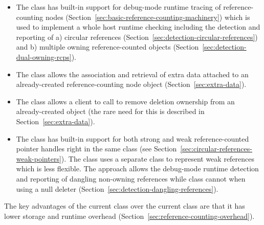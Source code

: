 \documentclass[pdf,ps2pdf,11pt]{SANDreport}
\begin{document}
\begin{itemize}

{}\item The {} class has built-in support for debug-mode
runtime tracing of reference-counting nodes
(Section~\ref{sec:basic-reference-counting-machinery}) which is used
to implement a whole host runtime checking including the detection and
reporting of a) circular references
(Section~\ref{sec:detection-circular-references}) and b) multiple
owning reference-counted objects
(Section~\ref{sec:detection-dual-owning-rcps}).

{}\item The {} class allows the association and retrieval of
extra data attached to an already-created reference-counting node
object (Section~\ref{sec:extra-data}).

{}\item The {} class allows a client to call
{} to remove deletion ownership from an already-created
{} object (the rare need for this is described in
Section~\ref{sec:extra-data}).

{}\item The {} class has built-in support for both strong and
weak reference-counted pointer handles right in the same class (see
Section~\ref{sec:circular-references-weak-pointers}).  The
{} class uses a separate
{} class to represent weak references which is
less flexible.  The {} approach allows the debug-mode runtime
detection and reporting of dangling non-owning references while
{} class cannot when using a null deleter
(Section~\ref{sec:detection-dangling-references}).

\end{itemize}

The key advantages of the current {} class
over the current {} class are that it has lower storage and
runtime overhead (Section~\ref{sec:reference-counting-overhead}).
\end{document}
